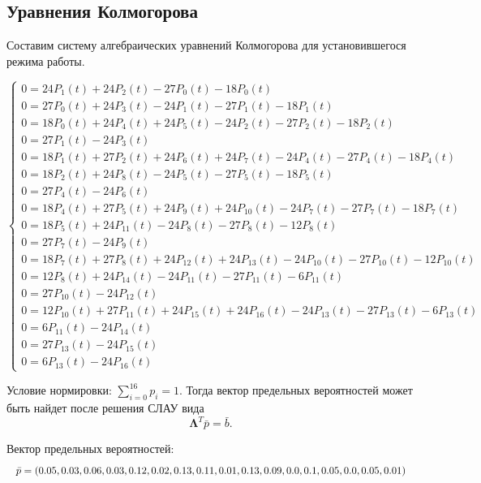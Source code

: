 \subsection{Уравнения Колмогорова}
Составим систему алгебраических уравнений Колмогорова для установившегося режима работы.

\[
\begin{cases}
    0 = 24P_{1} (t) +24P_{2} (t) -27P_{0} (t) -18P_{0} (t) \\ 
0 = 27P_{0} (t) +24P_{3} (t) -24P_{1} (t) -27P_{1} (t) -18P_{1} (t) \\ 
0 = 18P_{0} (t) +24P_{4} (t) +24P_{5} (t) -24P_{2} (t) -27P_{2} (t) -18P_{2} (t) \\ 
0 = 27P_{1} (t) -24P_{3} (t) \\ 
0 = 18P_{1} (t) +27P_{2} (t) +24P_{6} (t) +24P_{7} (t) -24P_{4} (t) -27P_{4} (t) -18P_{4} (t) \\ 
0 = 18P_{2} (t) +24P_{8} (t) -24P_{5} (t) -27P_{5} (t) -18P_{5} (t) \\ 
0 = 27P_{4} (t) -24P_{6} (t) \\ 
0 = 18P_{4} (t) +27P_{5} (t) +24P_{9} (t) +24P_{10} (t) -24P_{7} (t) -27P_{7} (t) -18P_{7} (t) \\ 
0 = 18P_{5} (t) +24P_{11} (t) -24P_{8} (t) -27P_{8} (t) -12P_{8} (t) \\ 
0 = 27P_{7} (t) -24P_{9} (t) \\ 
0 = 18P_{7} (t) +27P_{8} (t) +24P_{12} (t) +24P_{13} (t) -24P_{10} (t) -27P_{10} (t) -12P_{10} (t) \\ 
0 = 12P_{8} (t) +24P_{14} (t) -24P_{11} (t) -27P_{11} (t) -6P_{11} (t) \\ 
0 = 27P_{10} (t) -24P_{12} (t) \\ 
0 = 12P_{10} (t) +27P_{11} (t) +24P_{15} (t) +24P_{16} (t) -24P_{13} (t) -27P_{13} (t) -6P_{13} (t) \\ 
0 = 6P_{11} (t) -24P_{14} (t) \\ 
0 = 27P_{13} (t) -24P_{15} (t) \\ 
0 = 6P_{13} (t) -24P_{16} (t) 
\end{cases}
\]

Условие нормировки: $\sum\limits_{i=0}^{ 16 }p_i=1$.
Тогда вектор предельных вероятностей может быть найдет после решения СЛАУ вида $$\mathbf{\Lambda}^T\bar{p}=\bar{b}.$$

 Вектор предельных вероятностей:
 \[
    \resizebox{\textwidth}{!}{$
    \bar{p}= \left(  0.05, 0.03, 0.06, 0.03, 0.12, 0.02, 0.13, 0.11, 0.01, 0.13, 0.09, 0.0, 0.1, 0.05, 0.0, 0.05, 0.01 \right)
    $}
\]

